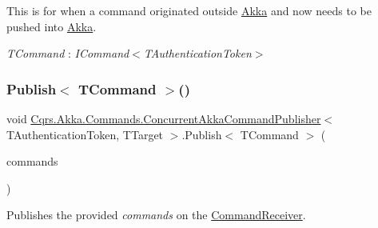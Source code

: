 This is for when a command originated outside \hyperlink{namespaceCqrs_1_1Akka}{Akka} and now needs to be pushed into \hyperlink{namespaceCqrs_1_1Akka}{Akka}. \begin{Desc}
\item[Type Constraints]\begin{description}
\item[{\em T\+Command} : {\em I\+Command$<$T\+Authentication\+Token$>$}]\end{description}
\end{Desc}
\mbox{\label{classCqrs_1_1Akka_1_1Commands_1_1ConcurrentAkkaCommandPublisher_af8c681932cd7586a70cb65db8cbb5bfe_af8c681932cd7586a70cb65db8cbb5bfe}} 
\subsubsection{\texorpdfstring{Publish$<$ T\+Command $>$()}{Publish< TCommand >()}\hspace{0.1cm}{\footnotesize\ttfamily [2/2]}}
{\footnotesize\ttfamily void \hyperlink{classCqrs_1_1Akka_1_1Commands_1_1ConcurrentAkkaCommandPublisher}{Cqrs.\+Akka.\+Commands.\+Concurrent\+Akka\+Command\+Publisher}$<$ T\+Authentication\+Token, T\+Target $>$.Publish$<$ T\+Command $>$ (\begin{DoxyParamCaption}\item[{I\+Enumerable$<$ T\+Command $>$}]{commands }\end{DoxyParamCaption})}



Publishes the provided {\itshape commands}  on the \hyperlink{classCqrs_1_1Akka_1_1Commands_1_1ConcurrentAkkaCommandPublisher_a000c2cddf20768b5feec16a8f4e02587_a000c2cddf20768b5feec16a8f4e02587}{Command\+Receiver}. 

